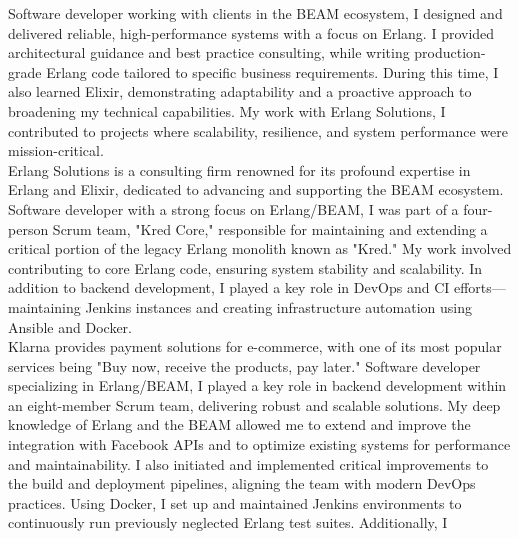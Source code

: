 \documentclass[purpleprocv]{procv}
\begin{document}
\begin{procv-twocolumns}
{          
          {Software developer working with clients in the BEAM ecosystem, I designed and delivered reliable, 
          high-performance systems with a focus on Erlang. I provided architectural guidance and best practice 
          consulting, while writing production-grade Erlang code tailored to specific business requirements. During this time, 
          I also learned Elixir, demonstrating adaptability and a proactive approach to broadening my technical capabilities. 
          My work with Erlang Solutions, I contributed to projects where scalability, resilience, and system performance were mission-critical.
          \\[3pt]
          Erlang Solutions is a consulting firm renowned for its profound expertise in Erlang and Elixir, 
          dedicated to advancing and supporting the BEAM ecosystem.}
          {Software developer with a strong focus on Erlang/BEAM, I was part of a four-person Scrum team, "Kred Core," 
          responsible for maintaining and extending a critical portion of the legacy Erlang monolith known as "Kred." My 
          work involved contributing to core Erlang code, ensuring system stability and scalability. In addition to 
          backend development, I played a key role in DevOps and CI efforts—maintaining Jenkins instances and creating 
          infrastructure automation using Ansible and Docker.
          \\[3pt]
          Klarna provides payment solutions for e-commerce, with one of its most popular services being 
          "Buy now, receive the products, pay later."}
          {Software developer specializing in Erlang/BEAM, I played a key role in backend development within an 
          eight-member Scrum team, delivering robust and scalable solutions. My deep knowledge of Erlang and the BEAM 
          allowed me to extend and improve the integration with Facebook APIs and to 
          optimize existing systems for performance and maintainability. I also initiated and implemented critical improvements 
          to the build and deployment pipelines, aligning the team with modern DevOps practices. Using Docker, I set up 
          and maintained Jenkins environments to continuously run previously neglected Erlang test suites. Additionally, I 
}}
\end{procv-twocolumns}
\end{document}
